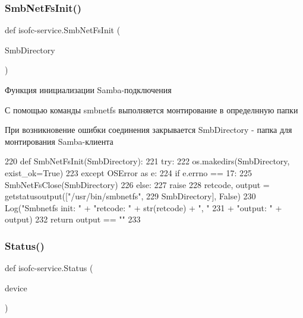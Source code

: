 \subsubsection{\texorpdfstring{Smb\+Net\+Fs\+Init()}{SmbNetFsInit()}}
{\footnotesize\ttfamily def isofc-\/service.\+Smb\+Net\+Fs\+Init (\begin{DoxyParamCaption}\item[{}]{Smb\+Directory }\end{DoxyParamCaption})}



Функция инициализации Samba-\/подключения 

С помощью команды smbnetfs выполняется монтирование в определнную папки

При возникновение ошибки соединения закрывается  Smb\+Directory -\/ папка для монтирования Samba-\/клиента 
\begin{DoxyCode}
220 \textcolor{keyword}{def }SmbNetFsInit(SmbDirectory):
221     \textcolor{keywordflow}{try}:
222         os.makedirs(SmbDirectory, exist\_ok=\textcolor{keyword}{True})
223     \textcolor{keywordflow}{except} OSError \textcolor{keyword}{as} e:
224         \textcolor{keywordflow}{if} e.errno == 17:
225             SmbNetFsClose(SmbDirectory)
226         \textcolor{keywordflow}{else}:
227             \textcolor{keywordflow}{raise}
228     retcode, output = getstatusoutput([\textcolor{stringliteral}{"/usr/bin/smbnetfs"},
229                                        SmbDirectory], \textcolor{keyword}{False})
230     Log(\textcolor{stringliteral}{"Smbnetfs init: "} + \textcolor{stringliteral}{"retcode: "} + str(retcode) + \textcolor{stringliteral}{", "}
231         + \textcolor{stringliteral}{"output: "} + output)
232     \textcolor{keywordflow}{return} output == \textcolor{stringliteral}{""}
233 
\end{DoxyCode}
\mbox{\label{isofc-service_8py_file_ade5fb73a2623e6354a2453b612e1943b}} 
\subsubsection{\texorpdfstring{Status()}{Status()}}
{\footnotesize\ttfamily def isofc-\/service.\+Status (\begin{DoxyParamCaption}\item[{}]{device }\end{DoxyParamCaption})}



